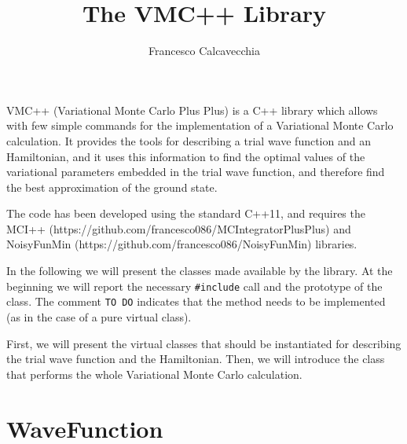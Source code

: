 \documentclass[11pt,a4paper,twoside]{article}
\title{The VMC++ Library}
\author{Francesco Calcavecchia}
\begin{document}
\maketitle

VMC++ (Variational Monte Carlo Plus Plus) is a C++ library which allows with few simple commands for the implementation of a Variational Monte Carlo calculation.
It provides the tools for describing a trial wave function and an Hamiltonian, and it uses this information to find the optimal values of the variational parameters embedded in the trial wave function, and therefore find the best approximation of the ground state.

The code has been developed using the standard C++11, and requires the MCI++ (https://github.com/francesco086/MCIntegratorPlusPlus) and NoisyFunMin (https://github.com/francesco086/NoisyFunMin) libraries.

In the following we will present the classes made available by the library.
At the beginning we will report the necessary \verb+#include+ call and the prototype of the class.
The comment \verb+TO DO+ indicates that the method needs to be implemented (as in the case of a pure virtual class).

First, we will present the virtual classes that should be instantiated for describing the trial wave function and the Hamiltonian.
Then, we will introduce the class that performs the whole Variational Monte Carlo calculation.


\section{WaveFunction} %
\label{sec:wave_function}
\end{document}
